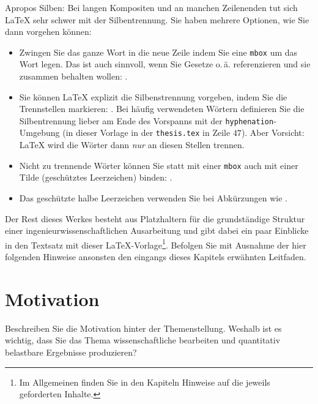 Apropos Silben: Bei langen Kompositen und an manchen Zeilenenden tut sich \LaTeX{} sehr schwer mit der Silbentrennung. Sie haben mehrere Optionen, wie Sie dann vorgehen können:
\begin{itemize}
    \item{Zwingen Sie das ganze Wort in die neue Zeile indem Sie eine \texttt{mbox} um das Wort legen. Das ist auch sinnvoll, wenn Sie Gesetze o.\,ä. referenzieren und sie zusammen behalten wollen: .}
    \item{Sie können \LaTeX{} explizit die Silbenstrennung vorgeben, indem Sie die Trennstellen markieren: . Bei häufig verwendeten Wörtern definieren Sie die Silbentrennung lieber am Ende des Vorspanns mit der \texttt{hyphenation}-Umgebung (in dieser Vorlage in der \texttt{thesis.tex} in Zeile $47$). Aber Vorsicht: \LaTeX{} wird die Wörter dann \emph{nur} an diesen Stellen trennen.}
    \item{Nicht zu trennende Wörter können Sie statt mit einer \texttt{mbox} auch mit einer Tilde (geschütztes Leerzeichen) binden: .}
    \item{Das geschützte halbe Leerzeichen verwenden Sie bei Abkürzungen wie .}
\end{itemize}

Der Rest dieses Werkes besteht aus Platzhaltern für die grundständige Struktur einer ingenieurwissenschaftlichen Ausarbeitung und gibt dabei ein paar Einblicke in den Textsatz mit dieser \LaTeX{}-Vorlage\footnote{Im Allgemeinen finden Sie in den Kapiteln Hinweise auf die jeweils geforderten Inhalte.}. Befolgen Sie mit Ausnahme der hier folgenden Hinweise ansonsten den eingangs dieses Kapitels erwähnten  Leitfaden.



\section{Motivation}\label{sec:Intro:Motivation}
Beschreiben Sie die Motivation hinter der Themenstellung. Weshalb ist es wichtig, dass Sie das Thema wissenschaftliche bearbeiten und quantitativ belastbare Ergebnisse produzieren?


